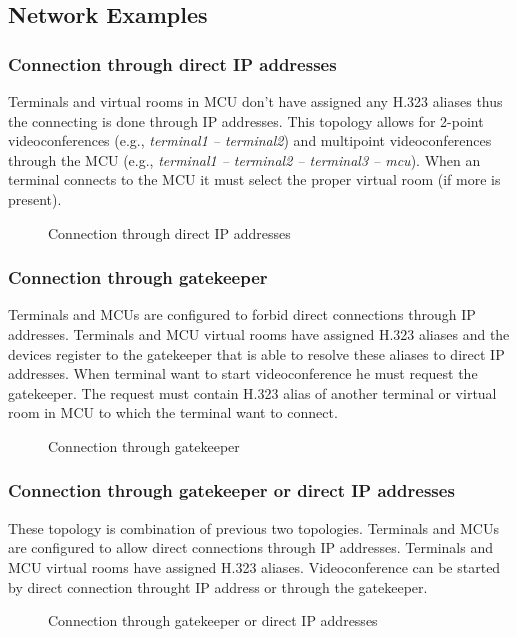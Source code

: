 \documentclass[a4paper]{report}
\newcommand{\graph}[4]{
\begin{figure}[h!]
\centering\scalebox{\ifx&#4& 0.7 \else #4 \fi}{}
\label{#1}
\caption{#3}
\end{figure}
}
\begin{document}
\subsection{Network Examples}

\subsubsection{Connection through direct IP addresses}

Terminals and virtual rooms in MCU don't have assigned any H.323 aliases thus the connecting is done through IP addresses. This topology allows for 2-point videoconferences (e.g., \emph{terminal1 -- terminal2}) and multipoint videoconferences through the MCU (e.g., \emph{terminal1 -- terminal2 -- terminal3 -- mcu}). When an terminal connects to the MCU it must select the proper virtual room (if more is present).

\graph{graph:h323:direct}{graph/h323_direct.tex}{Connection through direct IP addresses}{}

\subsubsection{Connection through gatekeeper}

Terminals and MCUs are configured to forbid direct connections through IP addresses. Terminals and MCU virtual rooms have assigned H.323 aliases and the devices register to the gatekeeper that is able to resolve these aliases to direct IP addresses. When terminal want to start videoconference he must request the gatekeeper. The request must contain H.323 alias of another terminal or virtual room in MCU to which the terminal want to connect.

\graph{graph:h323:gatekeeper}{graph/h323_gatekeeper.tex}{Connection through gatekeeper}{}

\subsubsection{Connection through gatekeeper or direct IP addresses}

These topology is combination of previous two topologies. Terminals and MCUs are configured to allow direct connections through IP addresses. Terminals and MCU virtual rooms have assigned H.323 aliases. Videoconference can be started by direct connection throught IP address or through the gatekeeper.

\graph{graph:h323:gatekeeper}{graph/h323_gatekeeper_or_direct.tex}{Connection through gatekeeper or direct IP addresses}{}
\end{document}
